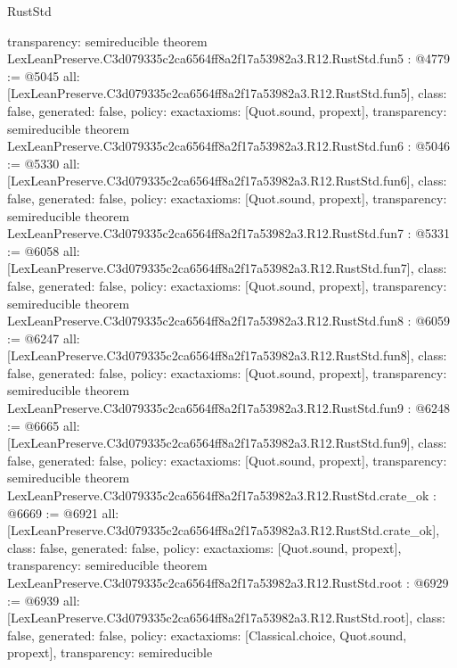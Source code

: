 \begin{lexlean}{RustStd}
\begin{coremodule}
{  transparency: semireducible
}
theorem LexLeanPreserve.C3d079335c2ca6564ff8a2f17a53982a3.R12.RustStd.fun5 : @4779 := @5045 {
  all: [LexLeanPreserve.C3d079335c2ca6564ff8a2f17a53982a3.R12.RustStd.fun5],
  class: false,
  generated: false,
  policy: exact{axioms: [Quot.sound, propext]},
  transparency: semireducible
}
theorem LexLeanPreserve.C3d079335c2ca6564ff8a2f17a53982a3.R12.RustStd.fun6 : @5046 := @5330 {
  all: [LexLeanPreserve.C3d079335c2ca6564ff8a2f17a53982a3.R12.RustStd.fun6],
  class: false,
  generated: false,
  policy: exact{axioms: [Quot.sound, propext]},
  transparency: semireducible
}
theorem LexLeanPreserve.C3d079335c2ca6564ff8a2f17a53982a3.R12.RustStd.fun7 : @5331 := @6058 {
  all: [LexLeanPreserve.C3d079335c2ca6564ff8a2f17a53982a3.R12.RustStd.fun7],
  class: false,
  generated: false,
  policy: exact{axioms: [Quot.sound, propext]},
  transparency: semireducible
}
theorem LexLeanPreserve.C3d079335c2ca6564ff8a2f17a53982a3.R12.RustStd.fun8 : @6059 := @6247 {
  all: [LexLeanPreserve.C3d079335c2ca6564ff8a2f17a53982a3.R12.RustStd.fun8],
  class: false,
  generated: false,
  policy: exact{axioms: [Quot.sound, propext]},
  transparency: semireducible
}
theorem LexLeanPreserve.C3d079335c2ca6564ff8a2f17a53982a3.R12.RustStd.fun9 : @6248 := @6665 {
  all: [LexLeanPreserve.C3d079335c2ca6564ff8a2f17a53982a3.R12.RustStd.fun9],
  class: false,
  generated: false,
  policy: exact{axioms: [Quot.sound, propext]},
  transparency: semireducible
}
theorem LexLeanPreserve.C3d079335c2ca6564ff8a2f17a53982a3.R12.RustStd.crate_ok : @6669 := @6921 {
  all: [LexLeanPreserve.C3d079335c2ca6564ff8a2f17a53982a3.R12.RustStd.crate_ok],
  class: false,
  generated: false,
  policy: exact{axioms: [Quot.sound, propext]},
  transparency: semireducible
}
theorem LexLeanPreserve.C3d079335c2ca6564ff8a2f17a53982a3.R12.RustStd.root : @6929 := @6939 {
  all: [LexLeanPreserve.C3d079335c2ca6564ff8a2f17a53982a3.R12.RustStd.root],
  class: false,
  generated: false,
  policy: exact{axioms: [Classical.choice, Quot.sound, propext]},
  transparency: semireducible
}


\end{coremodule}
\end{lexlean}
